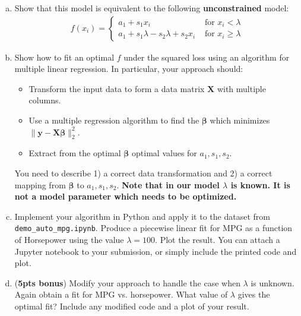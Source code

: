 \documentclass[10pt]{article}
\newcommand{\bs}[1]{\boldsymbol{#1}}
\newcommand{\bv}[1]{\mathbf{#1}}
\begin{document}
\begin{enumerate}[(a)]
	\item Show that this model is equivalent to the following \textbf{unconstrained} model:
	\begin{align*}
	f(x_i) = \begin{cases}
		a_1 + s_1x_i & \text{ for $x_i < \lambda$}\\ 
		a_1 + s_1 \lambda - s_2 \lambda + s_2x_i & \text{ for $x_i \geq \lambda$}
	\end{cases}
	\end{align*}
	
	\item Show how to fit an optimal $f$ under the squared loss using an algorithm for multiple linear regression. In particular, your approach should:
	\begin{itemize}
		\item Transform the input data to form a data matrix $\bv{X}$ with multiple columns.
		\item Use a multiple regression algorithm to find the $\bs{\beta}$ which minimizes $\|\bv{y} - \bv{X}\bs{\beta}\|_2^2.$
		\item Extract from the optimal $\bs{\beta}$ optimal values for $a_1, s_1, s_2$. 
	\end{itemize} 
	You need to describe 1) a correct data transformation and 2) a correct mapping from $\bs{\beta}$ to $a_1, s_1, s_2$. 
	\textbf{Note that in our model $\lambda$ is known. It is not a model parameter which needs to be optimized.}
	
	\item Implement your algorithm in Python and apply it to the dataset from \texttt{demo\_auto\_mpg.ipynb}. Produce a piecewise linear fit for MPG as a function of Horsepower using the value $\lambda = 100$. Plot the result. You can attach a Jupyter notebook to your submission, or simply include the printed code and plot. 
	
	\item (\textbf{5pts bonus}) Modify your approach to handle the case when $\lambda$ is unknown. Again obtain a fit for MPG vs. horsepower. What value of $\lambda$ gives the optimal fit? Include any modified code and a plot of your result.
\end{enumerate}
\end{document}

